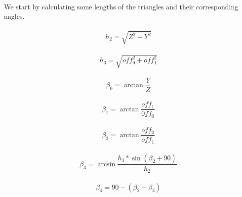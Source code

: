 \documentclass{article}
\begin{document}
    \paragraph{}
    We start by calculating some lengths of the triangles and their corresponding angles.

    \paragraph{}
    \begin{equation}
        h_2 = \sqrt{Z^2 + Y^2}
    \end{equation}

    \paragraph{}
    \begin{equation}
        h_3 = \sqrt{off_0^2 + off_1^2}
    \end{equation}

    \paragraph{}
    \begin{equation}
        \beta_0 = \arctan \frac{Y}{Z}
    \end{equation}

    \paragraph{}
    \begin{equation}
        \beta_1 = \arctan \frac{off_1}{0ff_0}
    \end{equation}

    \paragraph{}
    \begin{equation}
        \beta_2 = \arctan \frac{off_0}{off_1}
    \end{equation}

    \paragraph{}
    \begin{equation}
        \beta_3 = \arcsin \frac{h_3 * \sin(\beta_2 + 90)}{h_2}
    \end{equation}

    \paragraph{}
    \begin{equation}
        \beta_4 = 90 - (\beta_2 + \beta_3)
    \end{equation}
\end{document}
